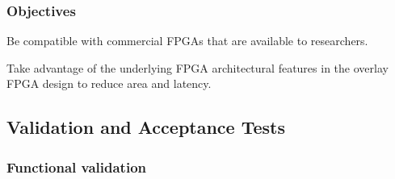\subsubsection{Objectives}

\begin{itemlist}
	\item Be compatible with commercial FPGAs that are available to researchers.
	\item Take advantage of the underlying FPGA architectural features in the overlay FPGA design to reduce area and latency.
\end{itemlist}


\subsection{Validation and Acceptance Tests}


\subsubsection{Functional validation}

